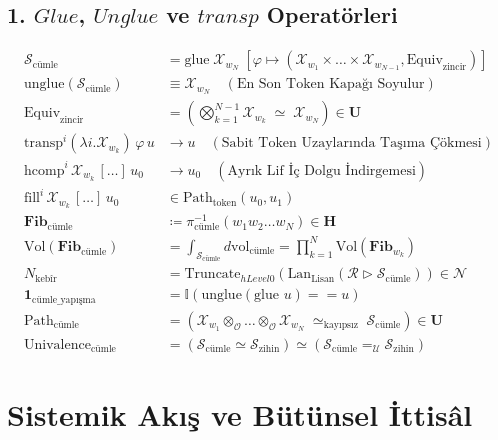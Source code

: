 \documentclass[11pt, a4paper]{article}
\begin{document}
\subsection{1. $Glue$, $Unglue$ ve $transp$ Operatörleri}
\begin{align}
\mathcal{S}_{\text{cümle}} &= \text{glue} \; \mathcal{X}_{w_N} \; \left[ \varphi \mapsto (\mathcal{X}_{w_1} \times \dots \times \mathcal{X}_{w_{N-1}}, \text{Equiv}_{\text{zincir}}) \right] \\
\text{unglue}(\mathcal{S}_{\text{cümle}}) &\equiv \mathcal{X}_{w_N} \quad (\text{En Son Token Kapağı Soyulur}) \\
\text{Equiv}_{\text{zincir}} &= \left( \bigotimes_{k=1}^{N-1} \mathcal{X}_{w_k} \;\simeq\; \mathcal{X}_{w_N} \right) \in \mathbf{U} \\
\text{transp}^i (\lambda i. \mathcal{X}_{w_k}) \, \varphi \, u &\longrightarrow u \quad (\text{Sabit Token Uzaylarında Taşıma Çökmesi}) \\
\text{hcomp}^i \, \mathcal{X}_{w_k} \, [\dots] \, u_0 &\longrightarrow u_0 \quad (\text{Ayrık Lif İç Dolgu İndirgemesi}) \\
\text{fill}^i \, \mathcal{X}_{w_k} \, [\dots] \, u_0 &\in \text{Path}_{\text{token}}(u_0, u_1) \\
\mathbf{Fib}_{\text{cümle}} &\coloneqq \pi_{\text{cümle}}^{-1}(w_1 w_2 \dots w_N) \in \mathbf{H} \\
\text{Vol}(\mathbf{Fib}_{\text{cümle}}) &= \int_{\mathcal{S}_{\text{cümle}}} d\text{vol}_{\text{cümle}} = \prod_{k=1}^N \text{Vol}(\mathbf{Fib}_{w_k}) \\
N_{\text{kebîr}} &= \text{Truncate}_{hLevel 0}\left( \text{Lan}_{\text{Lisan}} \left( \mathcal{R} \triangleright \mathcal{S}_{\text{cümle}} \right) \right) \in \mathcal{N} \\
\mathbf{1}_{\text{cümle\_yapışma}} &= \mathbb{I}\left( \text{unglue}(\text{glue } u) == u \right) \\
\text{Path}_{\text{cümle}} &= \left( \mathcal{X}_{w_1} \otimes_{\mathcal{O}} \dots \otimes_{\mathcal{O}} \mathcal{X}_{w_N} \;\simeq_{\text{kayıpsız}}\; \mathcal{S}_{\text{cümle}} \right) \in \mathbf{U} \\
\text{Univalence}_{\text{cümle}} &= (\mathcal{S}_{\text{cümle}} \simeq \mathcal{S}_{\text{zihin}}) \simeq (\mathcal{S}_{\text{cümle}} =_{\mathcal{U}} \mathcal{S}_{\text{zihin}})
\end{align}

\section{Sistemik Akış ve Bütünsel İttisâl}
\end{document}
